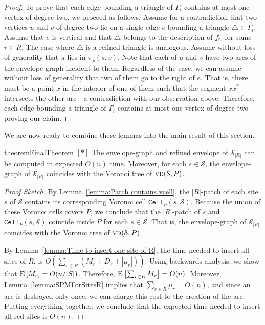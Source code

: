 \documentclass[a4paper,UKenglish]{socg-lipics-v2018}
\newcommand{\icell}[1][i]{${#1}$-patch\xspace}
\newcommand{\s}{\mathcal S}
\newcommand{\p}[3][P]{\ensuremath{\pi_{_{#1}}(#2, #3)}}
\newcommand{\cell}[2][P]{\ensuremath{\mathtt{Cell}_{\scriptscriptstyle #1}(#2)}}
\newcommand{\vd}[2][P]{\textsc{vd}(#2, #1)}
\newcommand{\ex}[1]{\textsc{E}\left[#1\right]}
\begin{document}
{\begin{proof}
To prove that each edge bounding a triangle of $\Gamma_i$ contains at most one vertex of degree two, we proceed as follows.
Assume for a contradiction that two vertices $u$ and $v$ of degree two lie on a single edge $e$ bounding a triangle $\triangle\in \Gamma_i$.
Assume that $e$ is vertical and that $\triangle$ belongs to the description of $f_C$ for some $r\in R$. 
The case where $\triangle$ is a refined triangle is analogous. Assume without loss of generality that $u$ lies in $\p{s}{v}$.
Note that each of $u$ and $v$ have two arcs of the envelope-graph incident to them.
Regardless of the case, we can assume without loss of generality that two of them go to the right of $e$. 
That is, there must be a point $x$ in the interior of one of them such that the segment $x x^*$ intersects the other arc---a contradiction with our observation above.
Therefore, each edge bounding a triangle of $\Gamma_i$ contains at most one vertex of degree two proving our claim.
\end{proof}
}

We are now ready to combine these lemmas into the main result of this section.

\begin{restatable}{theorem}{FinalTheorem}\label{thm:Final Theorem}
\hyperref[ProofFinalTheorem]{$[*]$}
The envelope-graph and refined envelope of $\s_{|R|}$ can be computed in expected $O(n)$ time.
Moreover, for each $s\in \s$, the envelope-graph of $\s_{|R|}$ coincides with the Voronoi tree of $\vd{\s}$.
\end{restatable}
\begin{proof}[Proof Sketch]
By Lemma~\ref{lemma:Patch contains vcell}, the \icell[|R|] of each site $s$ of $\s$ contains its corresponding Voronoi cell $\cell{s, \s}$. 
Because the union of these Voronoi cells covers $P$, we conclude that the \icell[|R|] of $s$ and $\cell{s, \s}$ coincide inside $P$ for each $s\in \s$.
That is, the envelope-graph of $\s_{|R|}$ coincides with the Voronoi tree of $\vd{\s}$.

By Lemma~\ref{lemma:Time to insert one site of R}, 
the time needed to insert all sites of $R$, is $O(\sum_{r\in R} (M_r + D_r + |\mu_r|))$. Using backwards analysis, we show that $\ex{M_r} = O(n/|S|)$.
Therefore, $\ex{\sum_{r\in R} M_r} = O(n)$. Moreover, Lemma~\ref{lemma:SPMForSitesR} implies that $\sum_{r\in R} \mu_r = O(n)$, and since an arc is destroyed only once, we can charge this cost to the creation of the arc. Putting everything together, we conclude that the expected time needed to insert all red sites is $O(n)$.
\end{proof}
\end{document}
